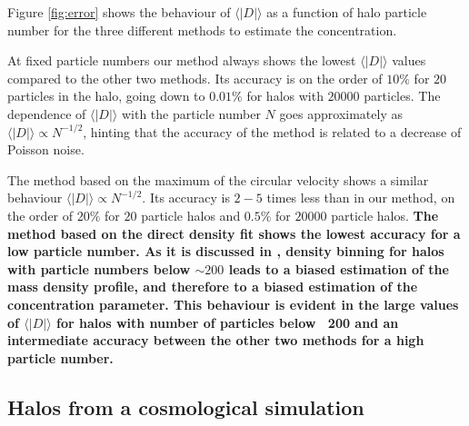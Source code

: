 \documentclass[a4,useAMS,usenatbib,usegraphicx]{mn2e}
\newcommand{\avg}[1]{\langle{#1}\rangle}
\begin{document}
Figure \ref{fig:error} shows the behaviour of $\avg{|D|}$ as a function of
halo particle number for the three different methods to estimate the
concentration.

At fixed particle numbers our method always shows the lowest
$\avg{|D|}$ values compared to the other two methods.  Its accuracy is
on the order of $10\%$ for $20$ particles in the halo, going down to
$0.01\%$ for halos with $20000$ particles.  The dependence of
$\avg{|D|}$ with the particle number $N$ goes approximately as
$\avg{|D|}\propto N^{-1/2}$, hinting that the accuracy of the method
is related to a decrease of Poisson noise.

The method based on the maximum of the circular velocity shows a
similar behaviour $\avg{|D|}\propto N^{-1/2}$.  Its accuracy is $2-5$
times less than in our method, on the order of $20\%$ for $20$
particle halos and $0.5\%$ for $20000$ particle halos. {\bf The method
  based on the direct density fit shows the lowest accuracy for a low
  particle number. As it is discussed in \citep{Munoz2011}, density
  binning for halos with particle numbers below $\sim200$ leads to a
  biased estimation of the mass density profile, and therefore to a
  biased estimation of the concentration parameter. This behaviour is
  evident in the large values of $\avg{|D|}$ for halos with number of
  particles below ~200 and an intermediate accuracy between the other
  two methods for a high particle number.}

\subsection{Halos from a cosmological simulation}
\end{document}
